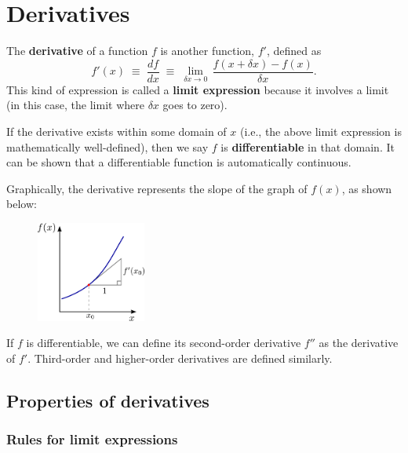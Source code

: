 \documentclass[10pt,a4paper]{article}
\begin{document}
\setcounter{page}{7}

\section{Derivatives}\label{derivatives}

The \textbf{derivative} of a function $f$ is another function, $f'$,
defined as
\begin{equation}
  f'(x) \;\equiv\; \frac{df}{dx} \;\equiv\; \lim_{\delta x \rightarrow 0} \, \frac{f(x + \delta x) - f(x)}{\delta x}.
\end{equation}
This kind of expression is called a \textbf{limit expression} because it
involves a limit (in this case, the limit where $\delta x$ goes to
zero).

If the derivative exists within some domain of $x$ (i.e., the above
limit expression is mathematically well-defined), then we say $f$ is
\textbf{differentiable} in that domain. It can be shown that a
differentiable function is automatically continuous.

Graphically, the derivative represents the slope of the graph of
$f(x)$, as shown below:

\begin{figure}[h]
  \centering\includegraphics[width=0.32\textwidth]{derivative}
\end{figure}

If $f$ is differentiable, we can define its second-order derivative
$f''$ as the derivative of $f'$. Third-order and higher-order
derivatives are defined similarly.

\subsection{Properties of derivatives}
\label{properties-of-derivatives}

\subsubsection{Rules for limit expressions}
\label{rules-for-limit-expressions}
\end{document}
